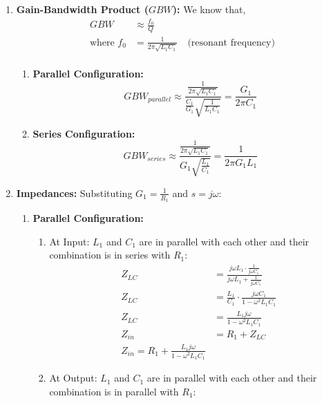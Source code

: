 \begin{enumerate}
\begin{enumerate}
\begin{align*}
        \end{align*}
        Unity DC gain for \(H_4(s)\).
    \end{enumerate}
  \item \textbf{Gain-Bandwidth Product (\(GBW\)):}
    We know that,
    \begin{align*}
      GBW &\approx \frac{f_0}{Q} \\
      \text{where } f_0 &= \frac{1}{2\pi \sqrt{L_1 C_1}} \quad \text{(resonant frequency)} \\
    \end{align*}
    \begin{enumerate}
      \item \textbf{Parallel Configuration:}
        \[
          GBW_{parallel} \approx \frac{\frac{1}{2\pi \sqrt{L_1 C_1}}}{\frac{C_1}{G_1} \sqrt{\frac{1}{L_1 C_1}}} = \frac{G_1}{2\pi C_1}
        \]
      \item \textbf{Series Configuration:}
        \[
          GBW_{series} \approx \frac{\frac{1}{2\pi \sqrt{L_1 C_1}}}{G_1 \sqrt{\frac{L_1}{C_1}}} = \frac{1}{2\pi G_1 L_1}
        \]
    \end{enumerate}
  \item \textbf{Impedances:}
    Substituting \(G_1 = \frac{1}{R_1}\) and \(s = j \omega\):
    \begin{enumerate}
      \item \textbf{Parallel Configuration:}
        \begin{enumerate}
          \item At Input:
            \(L_1\) and \(C_1\) are in parallel with each other and
            their combination is in series with \(R_1\):
            \begin{align*}
              Z_{LC} &= \frac{j \omega L_1 \cdot \frac{1}{j \omega C_1}}{j \omega L_1 + \frac{1}{j \omega C_1}} \\
              Z_{LC} &= \frac{L_1}{C_1} \cdot \frac{j \omega C_1}{1 - \omega^2 L_1 C_1} \\
              Z_{LC} &= \frac{L_1 j \omega}{1 - \omega^2 L_1 C_1} \\
              Z_{in} &= R_1 + Z_{LC} \\
              \boxed{Z_{in} = R_1 + \frac{L_1 j \omega}{1 - \omega^2 L_1 C_1}}
            \end{align*}
          \item At Output:
            \(L_1\) and \(C_1\) are in parallel with each other and
            their combination is in parallel with \(R_1\):

\end{enumerate}
\end{enumerate}
\end{enumerate}
